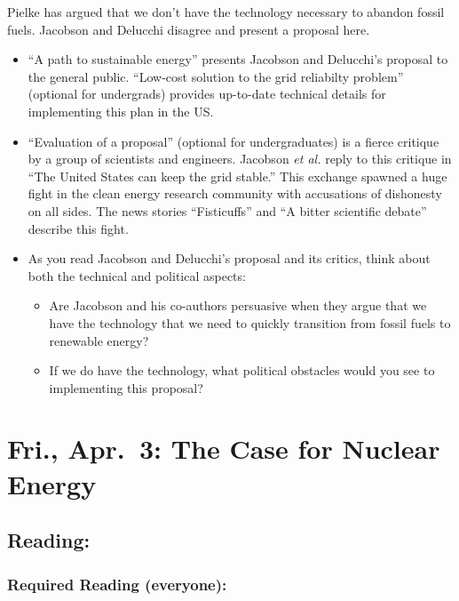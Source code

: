 \documentclass[
]{article}
\providecommand{\tightlist}{%
  \setlength{\itemsep}{0pt}\setlength{\parskip}{0pt}}
\begin{document}
Pielke has argued that we don't have the technology necessary to abandon
fossil fuels. Jacobson and Delucchi disagree and present a proposal
here.

\begin{itemize}
\item
  ``A path to sustainable energy'' presents Jacobson and Delucchi's
  proposal to the general public. ``Low-cost solution to the grid
  reliabilty problem'' (optional for undergrads) provides up-to-date
  technical details for implementing this plan in the US.
\item
  ``Evaluation of a proposal'' (optional for undergraduates) is a fierce
  critique by a group of scientists and engineers. Jacobson \emph{et
  al.} reply to this critique in ``The United States can keep the grid
  stable.'' This exchange spawned a huge fight in the clean energy
  research community with accusations of dishonesty on all sides. The
  news stories ``Fisticuffs'' and ``A bitter scientific debate''
  describe this fight.
\item
  As you read Jacobson and Delucchi's proposal and its critics, think
  about both the technical and political aspects:

  \begin{itemize}
  \tightlist
  \item
    Are Jacobson and his co-authors persuasive when they argue that we
    have the technology that we need to quickly transition from fossil
    fuels to renewable energy?
  \item
    If we do have the technology, what political obstacles would you see
    to implementing this proposal?
  \end{itemize}
\end{itemize}

\hypertarget{fri.-apr.-3-the-case-for-nuclear-energy}{%
\section{Fri., Apr.~3: The Case for Nuclear
Energy}\label{fri.-apr.-3-the-case-for-nuclear-energy}}

\hypertarget{reading-34}{%
\subsection{Reading:}\label{reading-34}}

\hypertarget{required-reading-everyone-29}{%
\subsubsection{Required Reading
(everyone):}\label{required-reading-everyone-29}}
\end{document}
